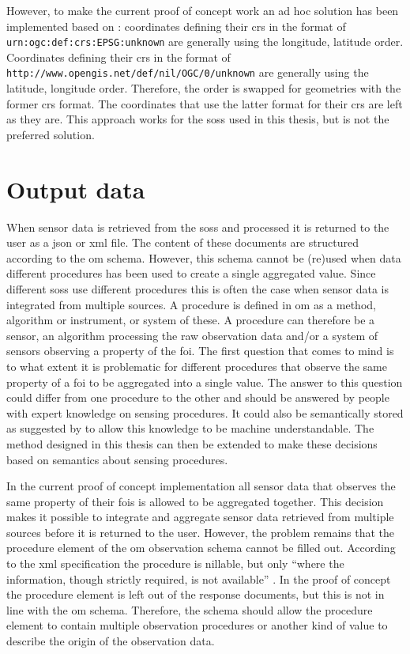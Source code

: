 However, to make the current proof of concept work an ad hoc solution has been implemented based on \cite{GEO:GDAL}: coordinates defining their \ac{crs} in the format of \texttt{urn:ogc:def:crs:EPSG:unknown} are generally using the longitude, latitude order. Coordinates defining their \ac{crs} in the format of \texttt{http://www.opengis.net/def/nil/OGC/0/unknown} are generally using the latitude, longitude order. Therefore, the order is swapped for geometries with the former \ac{crs} format. The coordinates that use the latter format for their \ac{crs} are left as they are. This approach works for the \aclp{sos} used in this thesis, but is not the preferred solution.   

\section{Output data}
When sensor data is retrieved from the \aclp{sos} and processed it is returned to the user as a \ac{json} or \ac{xml} file. The content of these documents are structured according to the \ac{om} schema. However, this schema cannot be (re)used when data different procedures has been used to create a single aggregated value. Since different \aclp{sos} use different procedures this is often the case when sensor data is integrated from multiple sources. A procedure is defined in \ac{om} as a method, algorithm or instrument, or system of these. A procedure can therefore be a sensor, an algorithm processing the raw observation data and/or a system of sensors observing a property of the \ac{foi}. The first question that comes to mind is to what extent it is problematic for different procedures that observe the same property of a \ac{foi} to be aggregated into a single value. The answer to this question could differ from one procedure to the other and should be answered by people with expert knowledge on sensing procedures. It could also be semantically stored as suggested by \cite{SSW:Stasch4} to allow this knowledge to be machine understandable. The method designed in this thesis can then be extended to make these decisions based on semantics about sensing procedures. 

In the current proof of concept implementation all sensor data that observes the same property of their \acp{foi} is allowed to  be aggregated together. This decision makes it possible to integrate and aggregate sensor data retrieved from multiple sources before it is returned to the user. However, the problem remains that the procedure element of the \ac{om} observation schema cannot be filled out. According to the \ac{xml} specification the procedure is nillable, but only \enquote{where the information, though strictly required, is not available} \citep[p. 42]{SW:OGC8}. In the proof of concept the procedure element is left out of the response documents, but this is not in line with the \ac{om} schema. Therefore, the schema should allow the procedure element to contain multiple observation procedures or another kind of value to describe the origin of the observation data. 


